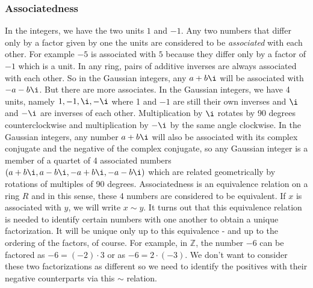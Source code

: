 

\subsubsection{Associatedness}
In the integers, we have the two units $1$ and $-1$. Any two numbers that differ only by a factor given by one the units are considered to be \emph{associated} with each other. For example $-5$ is associated with $5$ because they differ only by a factor of $-1$ which is a unit. In any ring, pairs of additive inverses are always associated with each other. So in the Gaussian integers, any $a + b \i$ will be associated with $-a - b \i$. But there are more associates. In the Gaussian integers, we have 4 units, namely $1,-1,\i,-\i$ where 1 and $-1$ are still their own inverses and $\i$ and $-\i$ are inverses of each other. Multiplication by $\i$ rotates by 90 degrees counterclockwise and multiplication by $-\i$ by the same angle clockwise. In the Gaussian integers, any number $a + b \i$ will also be associated with its complex conjugate and the negative of the complex conjugate, so any Gaussian integer is a member of a quartet of 4 associated numbers $(a + b\i, a - b \i, -a + b \i, -a - b \i)$ which are related geometrically by rotations of multiples of 90 degrees. Associatedness is an equivalence relation on a ring $R$ and in this sense, these 4 numbers are considered to be equivalent. If $x$ is associated with $y$, we will write $x \sim y$. 
It turns out that this equivalence relation is needed to identify certain numbers with one another to obtain a unique factorization. It will be unique only up to this equivalence - and up to the ordering of the factors, of course. For example, in $\mathbb{Z}$, the number $-6$ can be factored as $-6 = (-2) \cdot 3$ or as $-6 = 2 \cdot (-3)$. We don't want to consider these two factorizations as different so we need to identify the positives with their negative counterparts via this $\sim$ relation.


